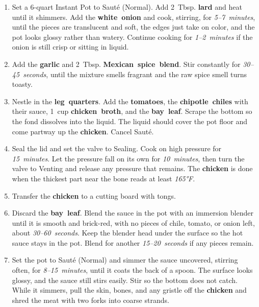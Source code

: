 \documentclass[11pt,letterpaper]{article}
\begin{document}
\begin{enumerate}
    \item Set a 6-quart Instant Pot to Sauté (Normal). Add 2~Tbsp. \textbf{lard} and heat until it shimmers. Add the \textbf{white~onion} and cook, stirring, for \textit{5--7~minutes}, until the pieces are translucent and soft, the edges just take on color, and the pot looks glossy rather than watery. Continue cooking for \textit{1--2~minutes} if the onion is still crisp or sitting in liquid.

    \item Add the \textbf{garlic} and 2~Tbsp. \textbf{Mexican~spice~blend}. Stir constantly for \textit{30--45~seconds}, until the mixture smells fragrant and the raw spice smell turns toasty.

    \item Nestle in the \textbf{leg~quarters}. Add the \textbf{tomatoes}, the \textbf{chipotle~chiles} with their sauce, 1~cup \textbf{chicken~broth}, and the \textbf{bay~leaf}. Scrape the bottom so the fond dissolves into the liquid. The liquid should cover the pot floor and come partway up the \textbf{chicken}. Cancel Sauté.

    \item Seal the lid and set the valve to Sealing. Cook on high pressure for \textit{15~minutes}. Let the pressure fall on its own for \textit{10~minutes}, then turn the valve to Venting and release any pressure that remains. The \textbf{chicken} is done when the thickest part near the bone reads at least \textit{165°F}.

    \item Transfer the \textbf{chicken} to a cutting board with tongs.

    \item Discard the \textbf{bay~leaf}. Blend the sauce in the pot with an immersion blender until it is smooth and brick-red, with no pieces of chile, tomato, or onion left, about \textit{30--60~seconds}. Keep the blender head under the surface so the hot sauce stays in the pot. Blend for another \textit{15--20~seconds} if any pieces remain.

    \item Set the pot to Sauté (Normal) and simmer the sauce uncovered, stirring often, for \textit{8--15~minutes}, until it coats the back of a spoon. The surface looks glossy, and the sauce still stirs easily. Stir so the bottom does not catch. While it simmers, pull the skin, bones, and any gristle off the \textbf{chicken} and shred the meat with two forks into coarse strands.


\end{enumerate}
\end{document}
